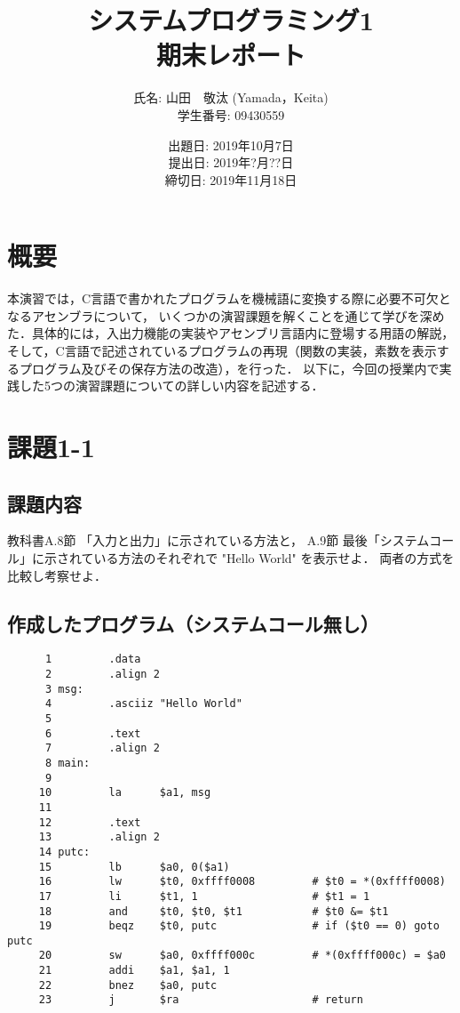 \documentclass[a4j,11pt]{jarticle}
\title{システムプログラミング1 \\
       期末レポート}
\author{氏名: 山田　敬汰 (Yamada，Keita) \\
        学生番号: 09430559}
\date{出題日: 2019年10月7日 \\   %
      提出日: 2019年?月??日 \\
      締切日: 2019年11月18日 \\}  %
\begin{document}
\maketitle



\section{概要}

本演習では，C言語で書かれたプログラムを機械語に変換する際に必要不可欠となるアセンブラについて，
いくつかの演習課題を解くことを通じて学びを深めた．具体的には，入出力機能の実装やアセンブリ言語内に登場する用語の解説，
そして，C言語で記述されているプログラムの再現（関数の実装，素数を表示するプログラム及びその保存方法の改造），を行った．
以下に，今回の授業内で実践した5つの演習課題についての詳しい内容を記述する．

\section{課題1-1}

\subsection{課題内容}
教科書A.8節 「入力と出力」に示されている方法と， 
A.9節 最後「システムコール」に示されている方法のそれぞれで "Hello World" を表示せよ．
両者の方式を比較し考察せよ．

\subsection{作成したプログラム（システムコール無し）}

\begin{verbatim}
      1	        .data
      2	        .align 2
      3	msg:
      4	        .asciiz "Hello World"
      5	
      6	        .text
      7	        .align 2      
      8	main:
      9	        
     10	        la      $a1, msg
     11	        
     12	        .text
     13	        .align 2  
     14	putc:
     15	        lb      $a0, 0($a1)             
     16	        lw      $t0, 0xffff0008         # $t0 = *(0xffff0008)
     17	        li      $t1, 1                  # $t1 = 1
     18	        and     $t0, $t0, $t1           # $t0 &= $t1
     19	        beqz    $t0, putc               # if ($t0 == 0) goto putc
     20	        sw      $a0, 0xffff000c         # *(0xffff000c) = $a0
     21	        addi    $a1, $a1, 1
     22	        bnez    $a0, putc
     23	        j       $ra                     # return
 
\end{verbatim}
\end{document}

